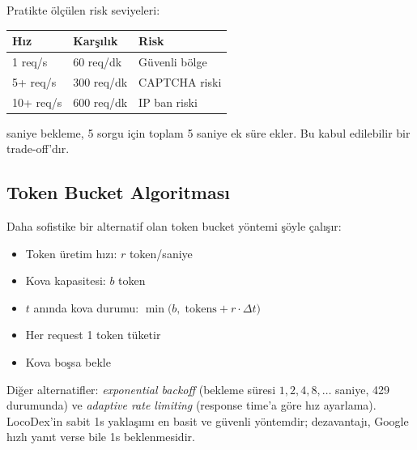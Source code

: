 \noindent
Pratikte \"{o}l\c{c}\"{u}len risk seviyeleri:
\begin{center}
\begin{tabular}{lll}
\toprule
\color{chapterBlue}\textbf{H{\i}z} & \color{chapterBlue}\textbf{Kar\c{s}{\i}l{\i}k} & \color{chapterBlue}\textbf{Risk} \\
\midrule
1 req/s  & 60 req/dk  & \color{codeGreen}G\"{u}venli b\"{o}lge \\
5+ req/s & 300 req/dk & \color{codeYellow}CAPTCHA riski \\
10+ req/s & 600 req/dk & \color{codeRed}IP ban riski \\
\bottomrule
\end{tabular}
\end{center}

 saniye bekleme, 5 sorgu i\c{c}in toplam 5 saniye ek s\"{u}re ekler. Bu kabul edilebilir bir trade-off'd{\i}r.

\subsection{Token Bucket Algoritmas{\i}}

Daha sofistike bir alternatif olan token bucket y\"{o}ntemi \c{s}\"{o}yle \c{c}al{\i}\c{s}{\i}r:

\begin{formulbox}
\begin{itemize}
  \item Token \"{u}retim h{\i}z{\i}: $r$ token/saniye
  \item Kova kapasitesi: $b$ token
  \item $t$ an{\i}nda kova durumu: $\min\!\big(b,\; \text{tokens} + r \cdot \Delta t\big)$
  \item Her request 1 token t\"{u}ketir
  \item Kova bo\c{s}sa bekle
\end{itemize}
\end{formulbox}

\noindent
Di\u{g}er alternatifler: \textit{exponential backoff} (bekleme s\"{u}resi $1, 2, 4, 8, \ldots$ saniye, 429 durumunda) ve \textit{adaptive rate limiting} (response time'a g\"{o}re h{\i}z ayarlama). LocoDex'in sabit 1s yakla\c{s}{\i}m{\i} en basit ve g\"{u}venli y\"{o}ntemdir; dezavantaj{\i}, Google h{\i}zl{\i} yan{\i}t verse bile 1s beklenmesidir.


